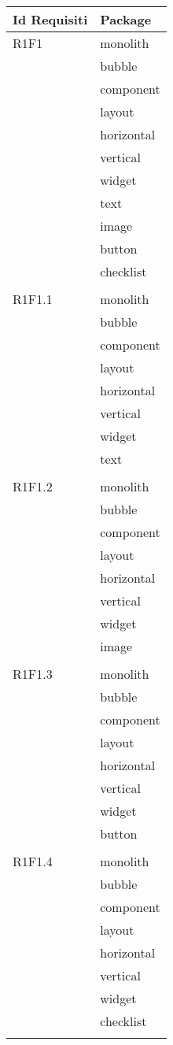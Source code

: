 \begin{center}
	\begin{longtable}{|p{7cm}|p{5cm}|}\hline
		Id Requisiti & Package \\ \hline
		R1F1 & monolith \\ & bubble \\ & component \\ & layout \\ & horizontal \\ & vertical \\ & widget \\ & text \\ & image \\ & button \\ & checklist \\ & \\ \hline
		R1F1.1 & monolith \\ & bubble \\ & component \\ & layout \\ & horizontal \\ & vertical \\ & widget \\ & text \\ & \\ \hline
		R1F1.2 & monolith \\ & bubble \\ & component \\ & layout \\ & horizontal \\ & vertical \\ & widget \\ & image \\ & \\ \hline
		R1F1.3 & monolith \\ & bubble \\ & component \\ & layout \\ & horizontal \\ & vertical \\ & widget \\ & button \\ & \\ \hline
		R1F1.4 & monolith \\ & bubble \\ & component \\ & layout \\ & horizontal \\ & vertical \\ & widget \\ & checklist \\ & \\ \hline

\end{longtable}
\end{center}
